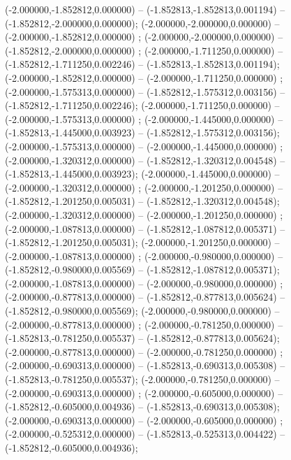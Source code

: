  (-2.000000,-1.852812,0.000000) -- (-1.852813,-1.852813,0.001194) -- (-1.852812,-2.000000,0.000000);
 (-2.000000,-2.000000,0.000000) -- (-2.000000,-1.852812,0.000000) ;
 (-2.000000,-2.000000,0.000000) -- (-1.852812,-2.000000,0.000000) ;
 (-2.000000,-1.711250,0.000000) -- (-1.852812,-1.711250,0.002246) -- (-1.852813,-1.852813,0.001194);
 (-2.000000,-1.852812,0.000000) -- (-2.000000,-1.711250,0.000000) ;
 (-2.000000,-1.575313,0.000000) -- (-1.852812,-1.575312,0.003156) -- (-1.852812,-1.711250,0.002246);
 (-2.000000,-1.711250,0.000000) -- (-2.000000,-1.575313,0.000000) ;
 (-2.000000,-1.445000,0.000000) -- (-1.852813,-1.445000,0.003923) -- (-1.852812,-1.575312,0.003156);
 (-2.000000,-1.575313,0.000000) -- (-2.000000,-1.445000,0.000000) ;
 (-2.000000,-1.320312,0.000000) -- (-1.852812,-1.320312,0.004548) -- (-1.852813,-1.445000,0.003923);
 (-2.000000,-1.445000,0.000000) -- (-2.000000,-1.320312,0.000000) ;
 (-2.000000,-1.201250,0.000000) -- (-1.852812,-1.201250,0.005031) -- (-1.852812,-1.320312,0.004548);
 (-2.000000,-1.320312,0.000000) -- (-2.000000,-1.201250,0.000000) ;
 (-2.000000,-1.087813,0.000000) -- (-1.852812,-1.087812,0.005371) -- (-1.852812,-1.201250,0.005031);
 (-2.000000,-1.201250,0.000000) -- (-2.000000,-1.087813,0.000000) ;
 (-2.000000,-0.980000,0.000000) -- (-1.852812,-0.980000,0.005569) -- (-1.852812,-1.087812,0.005371);
 (-2.000000,-1.087813,0.000000) -- (-2.000000,-0.980000,0.000000) ;
 (-2.000000,-0.877813,0.000000) -- (-1.852812,-0.877813,0.005624) -- (-1.852812,-0.980000,0.005569);
 (-2.000000,-0.980000,0.000000) -- (-2.000000,-0.877813,0.000000) ;
 (-2.000000,-0.781250,0.000000) -- (-1.852813,-0.781250,0.005537) -- (-1.852812,-0.877813,0.005624);
 (-2.000000,-0.877813,0.000000) -- (-2.000000,-0.781250,0.000000) ;
 (-2.000000,-0.690313,0.000000) -- (-1.852813,-0.690313,0.005308) -- (-1.852813,-0.781250,0.005537);
 (-2.000000,-0.781250,0.000000) -- (-2.000000,-0.690313,0.000000) ;
 (-2.000000,-0.605000,0.000000) -- (-1.852812,-0.605000,0.004936) -- (-1.852813,-0.690313,0.005308);
 (-2.000000,-0.690313,0.000000) -- (-2.000000,-0.605000,0.000000) ;
 (-2.000000,-0.525312,0.000000) -- (-1.852813,-0.525313,0.004422) -- (-1.852812,-0.605000,0.004936);

